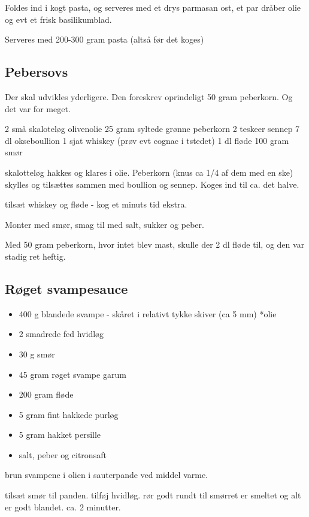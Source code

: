 \documentclass[
]{book}
\providecommand{\tightlist}{%
  \setlength{\itemsep}{0pt}\setlength{\parskip}{0pt}}
\begin{document}
Foldes ind i kogt pasta, og serveres med et drys parmasan ost, et par dråber olie og evt et frisk basilikumblad.

Serveres med 200-300 gram pasta (altså før det koges)

\subsection{Pebersovs}\label{pebersovs}

Der skal udvikles yderligere.
Den foreskrev oprindeligt 50 gram peberkorn. Og det var for meget.

2 små skaloteløg
olivenolie
25 gram syltede grønne peberkorn
2 teskeer sennep
7 dl okseboullion
1 sjat whiskey (prøv evt cognac i tstedet)
1 dl fløde
100 gram smør

skalotteløg hakkes og klares i olie.
Peberkorn (knus ca 1/4 af dem med en ske) skylles og tilsættes
sammen med boullion og sennep. Koges ind til ca. det halve.

tilsæt whiskey og fløde - kog et minuts tid ekstra.

Monter med smør, smag til med salt, sukker og peber.

Med 50 gram peberkorn, hvor intet blev mast, skulle der
2 dl fløde til, og den var stadig ret heftig.

\subsection{Røget svampesauce}\label{ruxf8get-svampesauce}

\begin{itemize}
\tightlist
\item
  400 g blandede svampe - skåret i relativt tykke skiver (ca 5 mm)
  *olie
\item
  2 smadrede fed hvidløg
\item
  30 g smør
\item
  45 gram røget svampe garum
\item
  200 gram fløde
\item
  5 gram fint hakkede purløg
\item
  5 gram hakket persille
\item
  salt, peber og citronsaft
\end{itemize}

brun svampene i olien i sauterpande ved middel varme.

tilsæt smør til panden. tilføj hvidløg. rør godt rundt til smørret er smeltet og alt er godt
blandet. ca. 2 minutter.
\end{document}
